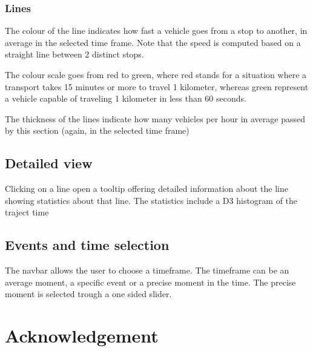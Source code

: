 \documentclass[11pt]{article}%
\begin{document}
\subsubsection{Lines}
The colour of the line indicates how fast a vehicle goes from a stop to another, in average in the selected time frame. Note that the speed is computed based on a straight line between 2 distinct stops.

The colour scale goes from red to green, where red stands for a situation where a transport takes 15 minutes or more to travel 1 kilometer, whereas green represent a vehicle capable of traveling 1 kilometer in less than 60 seconds.

The thickness of the lines indicate how many vehicles per hour in average passed by this section (again, in the selected time frame)


\subsection{Detailed view}



Clicking on a line open a tooltip offering detailed information about the line showing statistics about that line. The statistics include a D3 histogram of the traject time



\subsection{Events and time selection}

The navbar allows the user to choose a timeframe. The timeframe can be an average moment, a specific event or a precise moment in the time. The precise moment is selected trough a one sided slider.

\section{Acknowledgement}
\end{document}
